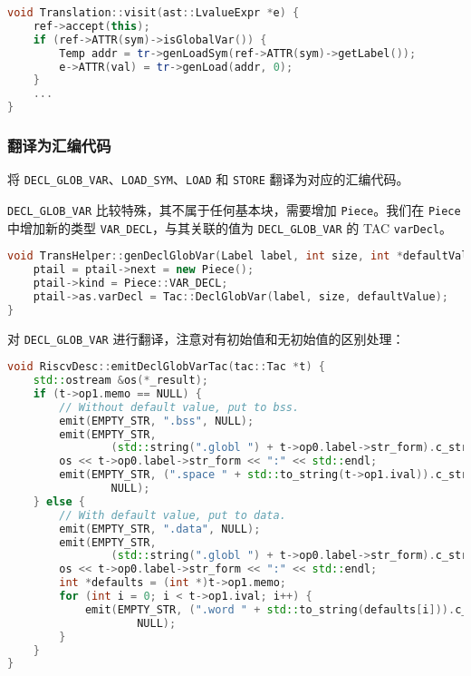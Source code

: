 \documentclass[a4paper]{article}
\begin{document}
\begin{lstlisting}[language=c++]
void Translation::visit(ast::LvalueExpr *e) {
    ref->accept(this);
    if (ref->ATTR(sym)->isGlobalVar()) {
        Temp addr = tr->genLoadSym(ref->ATTR(sym)->getLabel());
        e->ATTR(val) = tr->genLoad(addr, 0);
    }
    ...
}
\end{lstlisting}

\subsubsection{翻译为汇编代码}

将 \texttt{DECL\_GLOB\_VAR}、\texttt{LOAD\_SYM}、\texttt{LOAD} 和 \texttt{STORE} 翻译为对应的汇编代码。

\texttt{DECL\_GLOB\_VAR} 比较特殊，其不属于任何基本块，需要增加 \texttt{Piece}。我们在 \texttt{Piece} 中增加新的类型 \texttt{VAR\_DECL}，与其关联的值为 \texttt{DECL\_GLOB\_VAR} 的 TAC \texttt{varDecl}。

\begin{lstlisting}[language=c++]
void TransHelper::genDeclGlobVar(Label label, int size, int *defaultValue) {
    ptail = ptail->next = new Piece();
    ptail->kind = Piece::VAR_DECL;
    ptail->as.varDecl = Tac::DeclGlobVar(label, size, defaultValue);
}
\end{lstlisting}

对 \texttt{DECL\_GLOB\_VAR} 进行翻译，注意对有初始值和无初始值的区别处理：

\begin{lstlisting}[language=c++]
void RiscvDesc::emitDeclGlobVarTac(tac::Tac *t) {
    std::ostream &os(*_result);
    if (t->op1.memo == NULL) {
        // Without default value, put to bss.
        emit(EMPTY_STR, ".bss", NULL);
        emit(EMPTY_STR,
                (std::string(".globl ") + t->op0.label->str_form).c_str(), NULL);
        os << t->op0.label->str_form << ":" << std::endl;
        emit(EMPTY_STR, (".space " + std::to_string(t->op1.ival)).c_str(),
                NULL);
    } else {
        // With default value, put to data.
        emit(EMPTY_STR, ".data", NULL);
        emit(EMPTY_STR,
                (std::string(".globl ") + t->op0.label->str_form).c_str(), NULL);
        os << t->op0.label->str_form << ":" << std::endl;
        int *defaults = (int *)t->op1.memo;
        for (int i = 0; i < t->op1.ival; i++) {
            emit(EMPTY_STR, (".word " + std::to_string(defaults[i])).c_str(),
                    NULL);
        }
    }
}    
\end{lstlisting}
\end{document}
